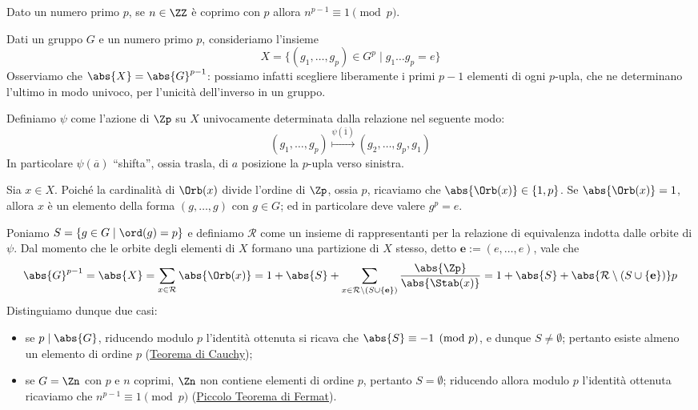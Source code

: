 \documentclass[11pt]{scrartcl}
\begin{document}
	\begin{theorem}
		\label{teorema1.45}
		Dato un numero primo $p$, se $n \in \ZZ$ è coprimo con $p$ allora 
		$n^{p - 1} \equiv 1 \pmod p$.
	\end{theorem}
	
	Dati un gruppo $G$ e un numero primo $p$, consideriamo l'insieme 
	\[
	X = \{(g_1, \ldots, g_p) \in G^p\mid g_1\ldots g_p = e\}
	\]
	Osserviamo che $\abs{X} = \abs{G}^{p - 1}$: possiamo infatti scegliere liberamente
	i primi $p - 1$ elementi di ogni $p$-upla, che ne determinano l'ultimo in 
	modo univoco, per l'unicità dell'inverso in un gruppo. \medskip
	
	
	Definiamo $\psi$ come l'azione di $\Zp$ su $X$ univocamente determinata dalla relazione
	nel seguente modo:
	\[
	(g_1, \ldots, g_p) \overset{\psi(\overline{1})}{\mapsto} (g_2, \ldots, g_p, g_1)
	\]
	In particolare $\psi(\overline{a})$ ``shifta'', ossia trasla, di $a$ posizione
	la $p$-upla verso sinistra. \medskip
	
	Sia $x \in X$. Poiché la cardinalità di $\Orb(x)$ divide l'ordine di $\Zp$, ossia
	$p$, ricaviamo che $\abs{\Orb(x)} \in \{1, p\}$. Se $\abs{\Orb(x)} = 1$, allora
	$x$ è un elemento della forma $(g, \ldots, g)$ con $g \in G$; ed in particolare
	deve valere $g^p = e$. \medskip

	Poniamo $S = \{g\in G \mid \ord(g) = p\}$ e definiamo $\mathcal{R}$ come un insieme di 
	rappresentanti per la relazione di equivalenza indotta dalle orbite di $\psi$. Dal
	momento che
	le orbite degli elementi di $X$ formano una partizione di $X$ stesso, detto
	$\mathbf{e} := (e, \ldots, e)$, vale che
	\[
	\abs{G}^{p - 1} = \abs{X} = \sum_{x \in \mathcal{R}} \abs{\Orb(x)} = 1 + \abs{S} + \sum_{x \in \mathcal{R}\setminus (S \cup \{ \mathbf{e} \} )} \frac{\abs{\Zp}}{\abs{\Stab(x)}} = 1 + \abs{S} + \abs{\mathcal{R} \setminus (S \cup \{ \mathbf{e} \})} p
	\]
	Distinguiamo dunque due casi:
	\begin{itemize}
		\item se $p \mid \abs{G}$, riducendo modulo $p$ l'identità ottenuta si ricava che
		$\abs{S} \equiv -1 \pmod p$, e dunque $S \neq \emptyset$; pertanto
		esiste almeno un elemento di
		ordine $p$ (\hyperref[teorema1.44]{Teorema di Cauchy});
		\item se $G = \Zn$ con $p$ e $n$ coprimi, $\Zn$ non contiene elementi
		di ordine $p$, pertanto $S = \emptyset$; riducendo allora modulo $p$ l'identità ottenuta ricaviamo che
		$n^{p - 1} \equiv 1 \pmod p$ (\hyperref[teorema1.45]{Piccolo Teorema di Fermat}).
	\end{itemize}
	
\end{document}
